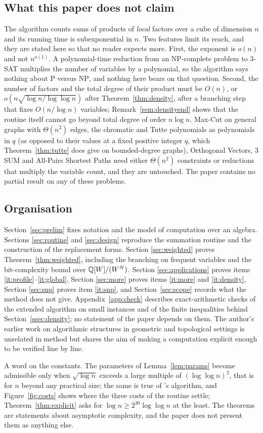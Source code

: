 \subsection{What this paper does not claim}
The algorithm counts sums of products of \emph{local} factors over a cube of
dimension $n$ and its running time is subexponential in $n$. Two features limit
its reach, and they are stated here so that no reader expects more.
First, the exponent is $o(n)$ and not $n^{o(1)}$. A polynomial-time reduction
from an NP-complete problem to $3$-SAT multiplies the number of variables by a
polynomial, so the algorithm says nothing about $\mathrm{P}$ versus
$\mathrm{NP}$, and nothing here bears on that question. Second, the number of
factors and the total degree of their product must be $O(n)$, or
$o(n\sqrt{\log n/\log\log n})$ after Theorem~\ref{thm:density}, after a branching
step that fixes $O(n/\log n)$ variables; Remark~\ref{rem:densityend} shows that the
routine itself cannot go beyond total degree of order $n\log n$. Max-Cut on general
graphs with $\Theta(n^2)$ edges, the chromatic and Tutte
polynomials as polynomials in $q$ (as opposed to their values at a fixed
positive integer $q$, which Theorem~\ref{thm:tutte} does give on bounded-degree
graphs), Orthogonal Vectors, $3$SUM and All-Pairs Shortest Paths need either
$\Theta(n^2)$ constraints or reductions that multiply the variable count, and
they are untouched. The paper contains no partial result on any of these
problems.

\subsection{Organisation}
Section~\ref{sec:prelim} fixes notation and the model of computation over an
algebra. Sections \ref{sec:routine} and \ref{sec:design} reproduce the
summation routine and the construction of the replacement forms. Section
\ref{sec:weighted} proves Theorem~\ref{thm:weighted}, including the branching on
frequent variables and the bit-complexity bound over $\mathbb{Q}[W]/(W^N)$. Section
\ref{sec:applications} proves items \ref{it:profile}--\ref{it:global}, Section
\ref{sec:more} proves items \ref{it:more} and \ref{it:density}, Section
\ref{sec:snp} proves item \ref{it:snp}, and Section~\ref{sec:scope} records what
the method does not give. Appendix~\ref{app:check} describes exact-arithmetic
checks of the extended algorithm on small instances and of the finite inequalities
behind Section~\ref{ssec:density}; no statement of the paper depends on them. The author's earlier work on algorithmic structures in geometric and
topological settings \cite{Bha26a,Bha26b,Bha26c} is unrelated in method but
shares the aim of making a computation explicit enough to be verified line by
line.

A word on the constants. The parameters of Lemma~\ref{lem:params} become
admissible only when $\sqrt{\log n}$ exceeds a large multiple of
$(\log\log n)^2$, that is for $n$ beyond any practical size; the same is true
of \oai{}'s algorithm, and Figure~\ref{fig:costs} shows where the three costs
of the routine settle; Theorem~\ref{thm:explicit} asks for
$\log n\ge2^{30}\log\log n$ at the least. The theorems are statements about asymptotic complexity,
and the paper does not present them as anything else.
